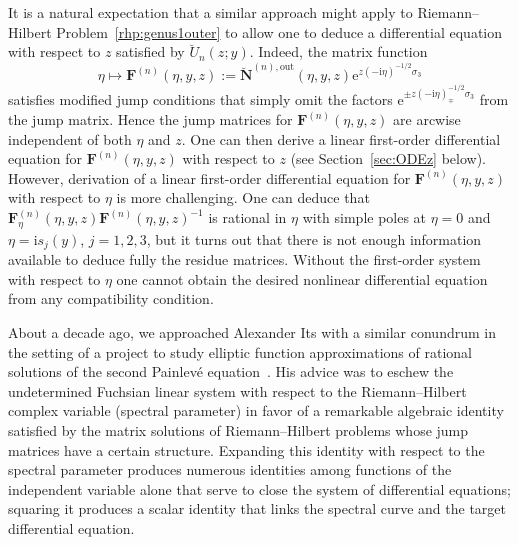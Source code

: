 \documentclass[11pt]{article}
\numberwithin{equation}{section}
\numberwithin{equation}{section}
\begin{document}
It is a natural expectation that a similar approach might apply to Riemann--Hilbert Problem~\ref{rhp:genus1outer} to allow one to deduce a differential equation with respect to $z$ satisfied by $\breve{U}_n(z;y)$. Indeed, the matrix function
\begin{equation}
\eta\mapsto\mathbf{F}^{(n)}(\eta,y,z):=\breve{\mathbf{N}}^{(n),\mathrm{out}}(\eta,y,z)\mathrm{e}^{z(-\mathrm{i}\eta)^{-1/2}\sigma_3}
\label{eq:F-N}
\end{equation}
satisfies modified jump conditions that simply omit the factors $\mathrm{e}^{\pm z(-\mathrm{i}\eta)_{\mp}^{-1/2}\sigma_3}$ from the jump matrix. Hence the jump matrices for $\mathbf{F}^{(n)}(\eta,y,z)$ are arcwise independent of both $\eta$ and $z$. One can then derive a linear first-order differential equation for $\mathbf{F}^{(n)}(\eta,y,z)$ with respect to $z$ (see Section~\ref{sec:ODEz} below). However, derivation of a linear first-order differential equation for $\mathbf{F}^{(n)}(\eta,y,z)$ with respect to $\eta$ is more challenging. One can deduce that $\mathbf{F}^{(n)}_\eta(\eta,y,z)\mathbf{F}^{(n)}(\eta,y,z)^{-1}$ is rational in $\eta$ with simple poles at $\eta=0$ and $\eta=\mathrm{i} s_j(y)$, $j=1,2,3$, but it turns out that there is not enough information available to deduce fully the residue matrices. Without the first-order system with respect to $\eta$ one cannot obtain the desired nonlinear differential equation from any compatibility condition.

About a decade ago, we approached Alexander Its with a similar conundrum in the
setting of a project to study elliptic function approximations of rational solutions
of the second Painlev\'e equation~\cite{BuckinghamM14}. His advice was to
eschew the undetermined Fuchsian linear system with respect to the Riemann--Hilbert
complex variable (spectral parameter) in favor of a remarkable algebraic identity
satisfied by the matrix solutions of Riemann--Hilbert problems whose jump matrices
have a certain structure. Expanding this identity with respect to the spectral
parameter produces numerous identities among functions of the independent variable
alone that serve to close the system of differential equations; squaring it produces
a scalar identity that links the spectral curve and the target differential equation.
\end{document}
